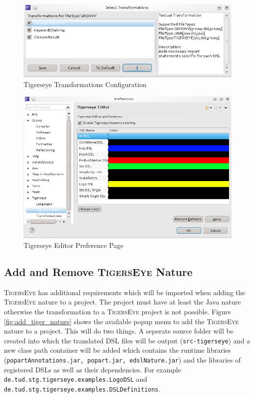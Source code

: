 \documentclass[article,colorback,accentcolor=tud4c]{tudreport}
\newcommand\tiger{%
  \textsc{TigersEye}
}
\begin{document}
	\begin{figure}
 \centering
 \includegraphics[scale=.5,keepaspectratio=true]{./pics/preferences_transformations_selected.png}
 \caption{Tigerseye Transformations Configuration}
 \label{fig:prefs_transformations_selected}
\end{figure}

	\begin{figure}
 \centering
 \includegraphics[scale=.5,keepaspectratio=true]{./pics/preferences_editor.png}
 \caption{Tigerseye Editor Preference Page}
 \label{fig:prefs_editor}
\end{figure}


	
	
	\subsection{Add and Remove \tiger Nature}
	  \tiger has additional requirements which will be imported when adding the \tiger nature to a project. The project must have at least the Java nature otherwise the transformation to a \tiger project is not possible. Figure \ref{fig:add_tiger_nature} shows the available popup menu to add the \tiger nature to a project. This will do two things. A seperate source folder will be created into which the translated DSL files will be output (\texttt{src-tigerseye}) and a new class path container will be added which contains the runtime libraries (\texttt{popartAnnotations.jar, popart.jar, edslNature.jar}) and the libraries of registered DSLs as well as their dependencies. For example \texttt{de.tud.stg.tigerseye.examples.LogoDSL} and \texttt{de.tud.stg.tigerseye.examples.DSLDefinitions}. 
	
\end{document}
